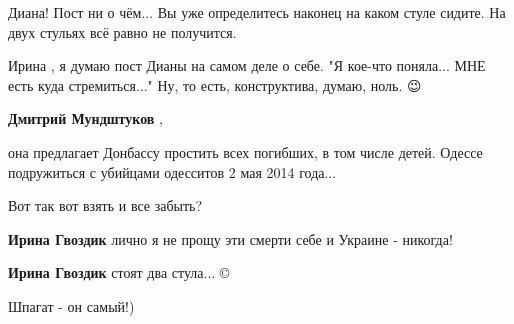 \begin{itemize}
Диана! Пост ни о чём...
Вы уже определитесь наконец на каком стуле сидите. На двух стульях всё равно не получится.

\begin{itemize}
 
Ирина , я думаю пост Дианы на самом деле о себе. "Я кое-что поняла... МНЕ есть куда стремиться..." Ну, то есть, конструктива, думаю, ноль. 😉

 
\textbf{Дмитрий Мундштуков} , 

она предлагает Донбассу простить всех погибших, в том числе детей. Одессе
подружиться с убийцами одесситов 2 мая 2014 года...

Вот так вот взять и все забыть?

 
\textbf{Ирина Гвоздик} лично я не прощу эти смерти себе и Украине - никогда!

 
\textbf{Ирина Гвоздик} стоят два стула... © \Smiley[1.0][yellow]

 
Шпагат - он самый!)

 

\end{itemize}
\end{itemize}
